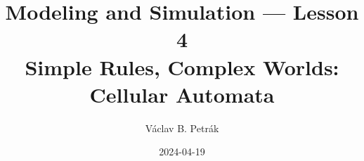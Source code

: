 \documentclass[11pt]{beamer}
\title{
Modeling and Simulation --- Lesson 4\\
\textbf{Simple Rules, Complex Worlds: 
Cellular Automata}}
\author{Václav B. Petrák}
\institute{Faculty of Biomedical Engineering\\
Czech Technical University}
\date{2024-04-19}
\begin{document}
\begin{frame}
  \titlepage
\end{frame}




\end{document}
